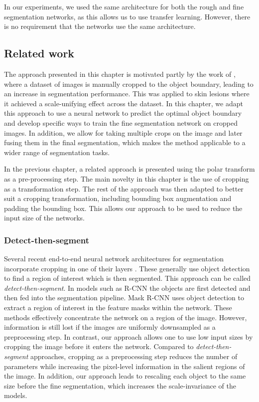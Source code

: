 In our experiments, we used the same architecture for both the rough and fine segmentation networks, as this allows us to use transfer learning. However, there is no requirement that the networks use the same architecture.

\subsection{Related work}

The approach presented in this chapter is motivated partly by the work of \citet{Qiu2018}, where a dataset of images is manually cropped to the object boundary, leading to an increase in segmentation performance. This was applied to skin lesions where it achieved a scale-unifying effect across the dataset. In this chapter, we adapt this approach to use a neural network to predict the optimal object boundary and develop specific ways to train the fine segmentation network on cropped images. In addition, we allow for taking multiple crops on the image and later fusing them in the final segmentation, which makes the method applicable to a wider range of segmentation tasks.

 In the previous chapter, a related approach is presented using the polar transform as a pre-processing step. The main novelty in this chapter is the use of cropping as a transformation step. The rest of the approach was then adapted to better suit a cropping transformation, including bounding box augmentation and padding the bounding box. This allows our approach to be used to reduce the input size of the networks.
 
\subsubsection{Detect-then-segment}

Several recent end-to-end neural network architectures for segmentation incorporate cropping in one of their layers \cite{girshickRichFeatureHierarchies2014, heMaskRCNN2017}. These generally use object detection to find a region of interest which is then segmented. This approach can be called \textit{detect-then-segment}. In models such as R-CNN \cite{girshickRichFeatureHierarchies2014} the objects are first detected and then fed into the segmentation pipeline. Mask R-CNN \cite{heMaskRCNN2017} uses object detection to extract a region of interest in the feature masks within the network. These methods effectively concentrate the network on a region of the image. However, information is still lost if the images are uniformly downsampled as a preprocessing step. In contrast, our approach allows one to use low input sizes by cropping the image before it enters the network. Compared to \textit{detect-then-segment} approaches, cropping as a preprocessing step reduces the number of parameters while increasing the pixel-level information in the salient regions of the image. In addition, our approach leads to rescaling each object to the same size before the fine segmentation, which increases the scale-invariance of the models.

